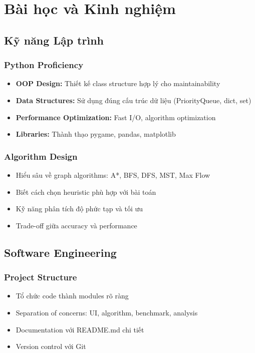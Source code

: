 \documentclass[12pt,a4paper]{article}
\begin{document}
\newpage
\section{Bài học và Kinh nghiệm}

\subsection{Kỹ năng Lập trình}

\subsubsection{Python Proficiency}
\begin{itemize}
    \item \textbf{OOP Design:} Thiết kế class structure hợp lý cho maintainability
    \item \textbf{Data Structures:} Sử dụng đúng cấu trúc dữ liệu (PriorityQueue, dict, set)
    \item \textbf{Performance Optimization:} Fast I/O, algorithm optimization
    \item \textbf{Libraries:} Thành thạo pygame, pandas, matplotlib
\end{itemize}

\subsubsection{Algorithm Design}
\begin{itemize}
    \item Hiểu sâu về graph algorithms: A*, BFS, DFS, MST, Max Flow
    \item Biết cách chọn heuristic phù hợp với bài toán
    \item Kỹ năng phân tích độ phức tạp và tối ưu
    \item Trade-off giữa accuracy và performance
\end{itemize}

\subsection{Software Engineering}

\subsubsection{Project Structure}
\begin{itemize}
    \item Tổ chức code thành modules rõ ràng
    \item Separation of concerns: UI, algorithm, benchmark, analysis
    \item Documentation với README.md chi tiết
    \item Version control với Git
\end{itemize}
\end{document}
